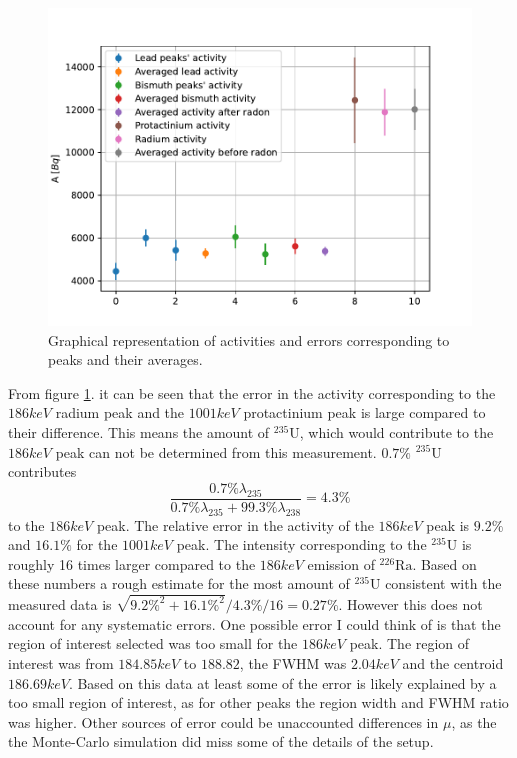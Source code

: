 \documentclass[pdftex,12pt,a4paper]{article}
\begin{document}
		\begin{figure}[H]
			\centering
			\includegraphics[scale=1]{./figs/graniteactivities.pdf}
			\caption{Graphical representation of activities and errors corresponding to peaks and their averages.}
			\label{graniteaveragesfig}
		\end{figure}
		From figure \ref{graniteaveragesfig}. it can be seen that the error in the activity corresponding to the $186keV$ radium peak and the $1001keV$ protactinium peak is large compared to their difference. This means the amount of $^{235}\text{U}$, which would contribute to the $186keV$ peak can not be determined from this measurement. $0.7 \%$ $^{235}\text{U}$ contributes
		\begin{equation}
			\frac{0.7 \% \lambda_{235}}{0.7 \% \lambda_{235} + 99.3 \% \lambda_{238}} = 4.3 \%
		\end{equation}
		to the $186keV$ peak. The relative error in the activity of the $186keV$ peak is $9.2\%$ and $16.1\%$ for the $1001keV$ peak. The intensity corresponding to the $^{235}\text{U}$ is roughly 16 times larger compared to the $186keV$ emission of $^{226}\text{Ra}$. Based on these numbers a rough estimate for the most amount of $^{235}\text{U}$ consistent with the measured data is $\sqrt{9.2\%^2 + 16.1\%^2} / 4.3\% / 16 = 0.27\%$. However this does not account for any systematic errors. One possible error I could think of is that the region of interest selected was too small for the $186keV$ peak. The region of interest was from $184.85keV$ to $188.82$, the FWHM was $2.04keV$ and the centroid $186.69keV$. Based on this data at least some of the error is likely explained by a too small region of interest, as for other peaks the region width and FWHM ratio was higher. Other sources of error could be unaccounted differences in $\mu$, as the the Monte-Carlo simulation did miss some of the details of the setup.
		
\end{document}
